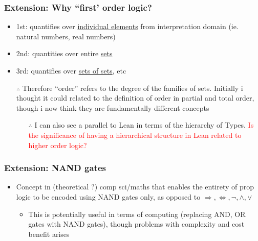 \documentclass{article}
\begin{document}
\subsubsection*{Extension: Why “first’ order logic?}
\begin{itemize}
  \item 1st: quantifies over \underline{individual elements} from interpretation domain (ie. natural numbers, real numbers)
  \item 2nd: quantities over entire \underline{sets}
  \item 3rd: quantifies over \underline{sets of sets}, etc
  \item[$\therefore$] Therefore “order” refers to the degree of the families of sets. Initially i thought it could related to the definition of order in partial and total order, though i now think they are fundamentally different concepts
  \begin{itemize}
    \item[$\therefore$] I can also see a parallel to Lean in terms of the hierarchy of Types. {\textcolor{red}{Is the significance of having a hierarchical structure in Lean related to higher order logic?}}
  \end{itemize}
\end{itemize}

\subsubsection*{Extension: NAND gates}
\begin{itemize}
  \item Concept in (theoretical ?) comp sci/maths that enables the entirety of prop logic to be encoded using NAND gates only, as opposed to {$\Rightarrow, \Leftrightarrow, \neg, \wedge, \vee$}
  \begin{itemize}
    \item This is potentially useful in terms of computing (replacing AND, OR gates with NAND gates), though problems with complexity and cost benefit arises
  \end{itemize}
\end{itemize}
\end{document}
